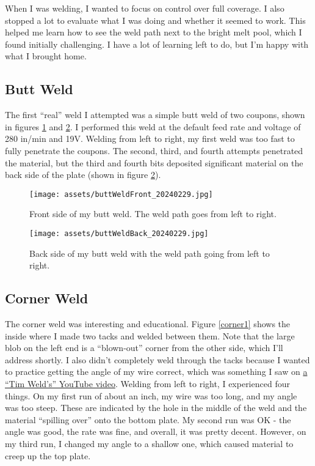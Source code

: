 \documentclass{article}
\begin{document}
When I was welding, I wanted to focus on control over full coverage. I also stopped a lot to evaluate what I was doing and whether it seemed to work. This helped me learn how to see the weld path next to the bright melt pool, which I found initially challenging. I have a lot of learning left to do, but I'm happy with what I brought home.

\subsection*{Butt Weld}

The first ``real'' weld I attempted was a simple butt weld of two coupons, shown in figures \ref{butt1} and \ref{butt2}. I performed this weld at the default feed rate and voltage of 280 in/min and 19V. Welding from left to right, my first weld was too fast to fully penetrate the coupons. The second, third, and fourth attempts penetrated the material, but the third and fourth bits deposited significant material on the back side of the plate (shown in figure \ref{butt2}).

\begin{figure}[h]
\caption{Front side of my butt weld. The weld path goes from left to right.}
\texttt{[image: assets/buttWeldFront\_20240229.jpg]}
\label{butt1}
\end{figure}

\begin{figure}[h]
\caption{Back side of my butt weld with the weld path going from left to right.}
\texttt{[image: assets/buttWeldBack\_20240229.jpg]}
\label{butt2}
\end{figure}

\subsection*{Corner Weld}

The corner weld was interesting and educational. Figure \ref{corner1} shows the inside where I made two tacks and welded between them. Note that the large blob on the left end is a ``blown-out'' corner from the other side, which I'll address shortly. I also didn't completely weld through the tacks because I wanted to practice getting the angle of my wire correct, which was something I saw on \href{https://www.youtube.com/watch?v=kUDrP2_JJ68}{a ``Tim Weld's'' YouTube video}. Welding from left to right, I experienced four things. On my first run of about an inch, my wire was too long, and my angle was too steep. These are indicated by the hole in the middle of the weld and the material ``spilling over'' onto the bottom plate. My second run was OK - the angle was good, the rate was fine, and overall, it was pretty decent. However, on my third run, I changed my angle to a shallow one, which caused material to creep up the top plate.
\end{document}
